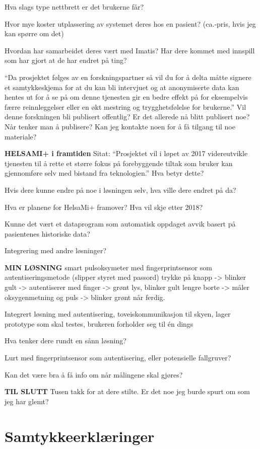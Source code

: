 Hva slags type nettbrett er det brukerne får?
 
Hvor mye koster utplassering av systemet deres hos en pasient? (ca.-pris, hvis jeg kan spørre om det)
 
Hvordan har samarbeidet deres vært med Imatis? 
Har dere kommet med innspill som har gjort at de har endret på ting? 
 
“Da prosjektet følges av en forskningspartner så vil du for å delta måtte signere et samtykkeskjema for at du kan bli intervjuet og at anonymiserte data kan hentes ut for å se på om denne tjenesten gir en bedre effekt på for eksempelvis færre reinnleggelser eller en økt mestring og trygghetsfølelse for brukerne.”
Vil denne forskningen bli publisert offentlig? Er det allerede nå blitt publisert noe? Når tenker man å publisere? Kan jeg kontakte noen for å få tilgang til noe materiale? 
 
\textbf{HELSAMI+ i framtiden}
Sitat: “Prosjektet vil i løpet av 2017 videreutvikle tjenesten til å rette et større fokus på forebyggende tiltak som bruker kan gjennomføre selv med bistand fra teknologien.”
Hva betyr dette?
 
Hvis dere kunne endre på noe i løsningen selv, hva ville dere endret på da?
 
Hva er planene for HelsaMi+ framover? Hva vil skje etter 2018?
 
Kunne det vært et dataprogram som automatisk oppdaget avvik basert på pasientenes historiske data? 
 
Integrering med andre løsninger? 
 
\textbf{MIN LØSNING}
smart pulsoksymeter med fingerprintsensor som autentiseringsmetode (slipper styret med passord)
trykke på knapp -> blinker gult -> autentiserer med finger -> grønt lys, blinker gult lengre borte -> måler oksygenmetning og puls -> blinker grønt når ferdig.
 
Integrert løsning med autentisering, toveiskommunikasjon til skyen, lager prototype som skal testes, brukeren forholder seg til én dings
 
Hva tenker dere rundt en sånn løsning?
 
Lurt med fingerprintsensor som autentisering, eller potensielle fallgruver? 
 
Kan det være bra å få info om når målingene skal gjøres?
 
\textbf{TIL SLUTT}
Tusen takk for at dere stilte.
Er det noe jeg burde spurt om som jeg har glemt?


\chapter{Samtykkeerklæringer}
\label{appendix:samtykke}

